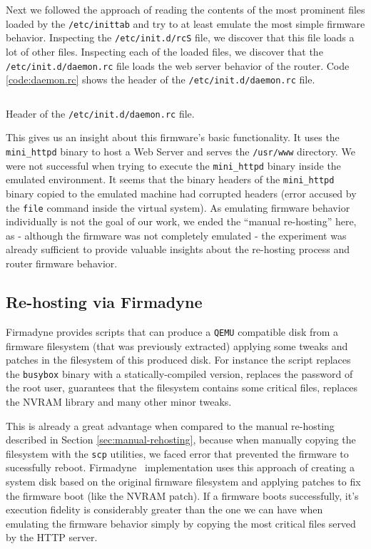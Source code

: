 Next we followed the approach of reading the contents of the most prominent files loaded by the {\tt /etc/inittab} and try to at least emulate the most simple firmware behavior. Inspecting the {\tt /etc/init.d/rcS} file, we discover that this file loads a lot of other files. Inspecting each of the loaded files, we discover that the {\tt /etc/init.d/daemon.rc} file loads the web server behavior of the router. Code \ref{code:daemon.rc} shows the header of the {\tt /etc/init.d/daemon.rc} file.

\begin{listing}[!ht]
\inputminted[fontsize=\footnotesize]{bash}{Code/daemon.rc}
\caption{Header of the {\tt /etc/init.d/daemon.rc} file.}
\label{code:daemon.rc}
\end{listing}

This gives us an insight about this firmware's basic functionality. It uses the {\tt mini\_httpd} binary to host a Web Server and serves the {\tt /usr/www} directory. We were not successful when trying to execute the {\tt mini\_httpd} binary inside the emulated environment. It seems that the binary headers of the {\tt mini\_httpd} binary copied to the emulated machine had corrupted headers (error accused by the {\tt file} command inside the virtual system). As emulating firmware behavior individually is not the goal of our work, we ended the ``manual re-hosting'' here, as - although the firmware was not completely emulated - the experiment was already sufficient to provide valuable insights about the re-hosting process and router firmware behavior.

\subsection{Re-hosting via Firmadyne}

Firmadyne provides scripts that can produce a {\tt QEMU} compatible disk from a firmware filesystem (that was previously extracted) applying some tweaks and patches in the filesystem of this produced disk. For instance the script replaces the {\tt busybox} binary with a statically-compiled version, replaces the password of the root user, guarantees that the filesystem contains some critical files, replaces the NVRAM library and many other minor tweaks.

This is already a great advantage when compared to the manual re-hosting described in Section \ref{sec:manual-rehosting}, because when manually copying the filesystem with the {\tt scp} utilities, we faced error that prevented the firmware to sucessfully reboot. Firmadyne~\cite{firmadyne} implementation uses this approach of creating a system disk based on the original firmware filesystem and applying patches to fix the firmware boot (like the NVRAM patch). If a firmware boots successfully, it's execution fidelity is considerably greater than the one we can have when emulating the firmware behavior simply by copying the most critical files served by the HTTP server.

